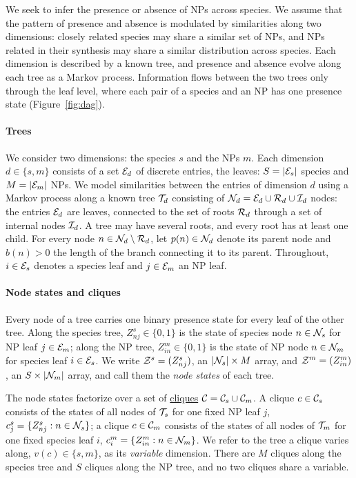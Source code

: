 \documentclass[
11pt, %
oneside, %
english, %
singlespacing, %
headsepline, %
chapterinoneline, %
]{MastersDoctoralThesis} %
\def\C{{\cal C}}
\def\E{{\cal E}}
\def\I{{\cal I}}
\def\N{{\cal N}}
\def\R{{\cal R}}
\def\T{{\cal T}}
\def\Z{{\cal Z}}
\begin{document}
We seek to infer the presence or absence of NPs across species. We assume that the pattern of presence and absence is modulated by similarities along two dimensions: closely related species may share a similar set of NPs, and NPs related in their synthesis may share a similar distribution across species. Each dimension is described by a known tree, and presence and absence evolve along each tree as a Markov process. Information flows between the two trees only through the leaf level, where each pair of a species and an NP has one presence state (Figure~\ref{fig:dag}).

\paragraph{Trees} We consider two dimensions: the species $s$ and the NPs $m$. Each dimension $d \in \{s, m\}$ consists of a set $\E_d$ of discrete entries, the leaves: $S = |\E_s|$ species and $M = |\E_m|$ NPs. We model similarities between the entries of dimension $d$ using a Markov process along a known tree $\T_d$ consisting of $\N_d = \E_d \cup \R_d \cup \I_d$ nodes: the entries $\E_d$ are leaves, connected to the set of roots $\R_d$ through a set of internal nodes $\I_d$. A tree may have several roots, and every root has at least one child. For every node $n \in \N_d \setminus \R_d$, let $p(n) \in \N_d$ denote its parent node and $b(n) > 0$ the length of the branch connecting it to its parent. Throughout, $i \in \E_s$ denotes a species leaf and $j \in \E_m$ an NP leaf.

\paragraph{Node states and cliques} Every node of a tree carries one binary presence state for every leaf of the other tree. Along the species tree, $Z^s_{nj} \in \{0,1\}$ is the state of species node $n \in \N_s$ for NP leaf $j \in \E_m$; along the NP tree, $Z^m_{in} \in \{0,1\}$ is the state of NP node $n \in \N_m$ for species leaf $i \in \E_s$. We write $\Z^s = (Z^s_{nj})$, an $|\N_s| \times M$ array, and $\Z^m = (Z^m_{in})$, an $S \times |\N_m|$ array, and call them the \emph{node states} of each tree.

The node states factorize over a set of \href{https://en.wikipedia.org/wiki/Clique_(graph_theory)}{cliques} $\C = \C_s \cup \C_m$. A clique $c \in \C_s$ consists of the states of all nodes of $\T_s$ for one fixed NP leaf $j$, $c^s_j = \{Z^s_{nj} : n \in \N_s\}$; a clique $c \in \C_m$ consists of the states of all nodes of $\T_m$ for one fixed species leaf $i$, $c^m_i = \{Z^m_{in} : n \in \N_m\}$. We refer to the tree a clique varies along, $v(c) \in \{s, m\}$, as its \emph{variable} dimension. There are $M$ cliques along the species tree and $S$ cliques along the NP tree, and no two cliques share a variable.
\end{document}
